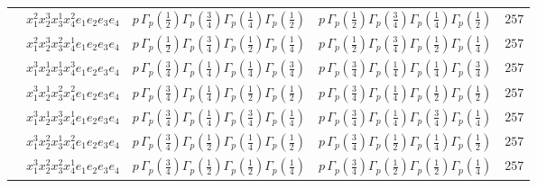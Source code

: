 \documentclass[11pt]{article}
\begin{document}
\begin{table}[ht]
{\begin{tabular}{@{}lllll@{}}
 & $x_{1}^{2} x_{2}^{3} x_{3}^{1} x_{4}^{2}  e_{1} e_{2} e_{3} e_{4}$ & $p \, \Gamma_p \left( \frac{1}{2} \right) \Gamma_p \left( \frac{3}{4} \right) \Gamma_p \left( \frac{1}{4} \right) \Gamma_p \left( \frac{1}{2} \right)$ & $p \, \Gamma_p \left( \frac{1}{2} \right) \Gamma_p \left( \frac{3}{4} \right) \Gamma_p \left( \frac{1}{4} \right) \Gamma_p \left( \frac{1}{2} \right)$ & $257$ \\
 & $x_{1}^{2} x_{2}^{3} x_{3}^{2} x_{4}^{1}  e_{1} e_{2} e_{3} e_{4}$ & $p \, \Gamma_p \left( \frac{1}{2} \right) \Gamma_p \left( \frac{3}{4} \right) \Gamma_p \left( \frac{1}{2} \right) \Gamma_p \left( \frac{1}{4} \right)$ & $p \, \Gamma_p \left( \frac{1}{2} \right) \Gamma_p \left( \frac{3}{4} \right) \Gamma_p \left( \frac{1}{2} \right) \Gamma_p \left( \frac{1}{4} \right)$ & $257$ \\
 & $x_{1}^{3} x_{2}^{1} x_{3}^{1} x_{4}^{3}  e_{1} e_{2} e_{3} e_{4}$ & $p \, \Gamma_p \left( \frac{3}{4} \right) \Gamma_p \left( \frac{1}{4} \right) \Gamma_p \left( \frac{1}{4} \right) \Gamma_p \left( \frac{3}{4} \right)$ & $p \, \Gamma_p \left( \frac{3}{4} \right) \Gamma_p \left( \frac{1}{4} \right) \Gamma_p \left( \frac{1}{4} \right) \Gamma_p \left( \frac{3}{4} \right)$ & $257$ \\
 & $x_{1}^{3} x_{2}^{1} x_{3}^{2} x_{4}^{2}  e_{1} e_{2} e_{3} e_{4}$ & $p \, \Gamma_p \left( \frac{3}{4} \right) \Gamma_p \left( \frac{1}{4} \right) \Gamma_p \left( \frac{1}{2} \right) \Gamma_p \left( \frac{1}{2} \right)$ & $p \, \Gamma_p \left( \frac{3}{4} \right) \Gamma_p \left( \frac{1}{4} \right) \Gamma_p \left( \frac{1}{2} \right) \Gamma_p \left( \frac{1}{2} \right)$ & $257$ \\
 & $x_{1}^{3} x_{2}^{1} x_{3}^{3} x_{4}^{1}  e_{1} e_{2} e_{3} e_{4}$ & $p \, \Gamma_p \left( \frac{3}{4} \right) \Gamma_p \left( \frac{1}{4} \right) \Gamma_p \left( \frac{3}{4} \right) \Gamma_p \left( \frac{1}{4} \right)$ & $p \, \Gamma_p \left( \frac{3}{4} \right) \Gamma_p \left( \frac{1}{4} \right) \Gamma_p \left( \frac{3}{4} \right) \Gamma_p \left( \frac{1}{4} \right)$ & $257$ \\
 & $x_{1}^{3} x_{2}^{2} x_{3}^{1} x_{4}^{2}  e_{1} e_{2} e_{3} e_{4}$ & $p \, \Gamma_p \left( \frac{3}{4} \right) \Gamma_p \left( \frac{1}{2} \right) \Gamma_p \left( \frac{1}{4} \right) \Gamma_p \left( \frac{1}{2} \right)$ & $p \, \Gamma_p \left( \frac{3}{4} \right) \Gamma_p \left( \frac{1}{2} \right) \Gamma_p \left( \frac{1}{4} \right) \Gamma_p \left( \frac{1}{2} \right)$ & $257$ \\
 & $x_{1}^{3} x_{2}^{2} x_{3}^{2} x_{4}^{1}  e_{1} e_{2} e_{3} e_{4}$ & $p \, \Gamma_p \left( \frac{3}{4} \right) \Gamma_p \left( \frac{1}{2} \right) \Gamma_p \left( \frac{1}{2} \right) \Gamma_p \left( \frac{1}{4} \right)$ & $p \, \Gamma_p \left( \frac{3}{4} \right) \Gamma_p \left( \frac{1}{2} \right) \Gamma_p \left( \frac{1}{2} \right) \Gamma_p \left( \frac{1}{4} \right)$ & $257$ \\

\end{tabular}}
\end{table}
\end{document}
